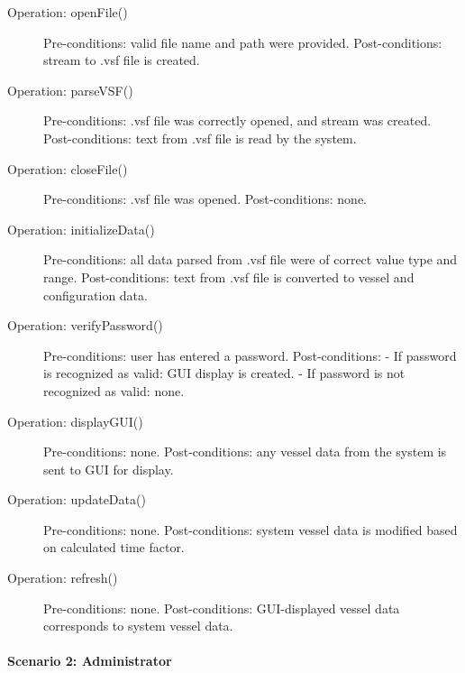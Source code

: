 \documentclass{article}
\begin{document}
\begin{description}
  \item[Operation: openFile()] Pre-conditions: valid file name and path were provided.\newline
  Post-conditions: stream to .vsf file is created.
  \item[Operation: parseVSF()] Pre-conditions: .vsf file was correctly opened, and stream was created.\newline
  Post-conditions: text from .vsf file is read by the system.
    \item[Operation: closeFile()] Pre-conditions: .vsf file was opened.\newline
  Post-conditions: none.
    \item[Operation: initializeData()] Pre-conditions: all data parsed from .vsf file were of correct value type and range.\newline
  Post-conditions: text from .vsf file is converted to vessel and configuration data.
    \item[Operation: verifyPassword()] Pre-conditions: user has entered a password.\newline
  Post-conditions:\newline
  - If password is recognized as valid: GUI display is created.\newline
  - If password is not recognized as valid: none.
    \item[Operation: displayGUI()] Pre-conditions: none.\newline
  Post-conditions: any vessel data from the system is sent to GUI for display.
    \item[Operation: updateData()] Pre-conditions: none.\newline
  Post-conditions: system vessel data is modified based on calculated time factor.
    \item[Operation: refresh()] Pre-conditions: none.\newline
  Post-conditions: GUI-displayed vessel data corresponds to system vessel data.
\end{description}

\break
\paragraph{Scenario 2: Administrator}
\end{document}
